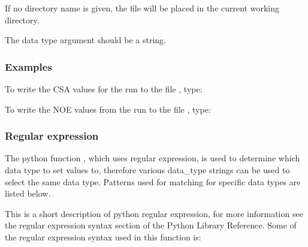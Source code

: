 If no directory name is given, the file will be placed in the current working directory.

The data type argument should be a string.


\subsubsection{Examples}

To write  the CSA values for the run 
 to the file 
, type:





To write  the NOE values from the run 
 to the file 
, type:









\subsubsection{Regular expression}

The python  function 
, which uses regular expression,  is used to determine which data
type to set values to, therefore various data\_type strings can be used to select the same
data type.  Patterns used for matching for specific data types are listed below.

This is a short description of python  regular expression,  for more information see the
regular expression  syntax section of the Python  Library Reference.  Some of the regular
expression syntax used in this function is:

